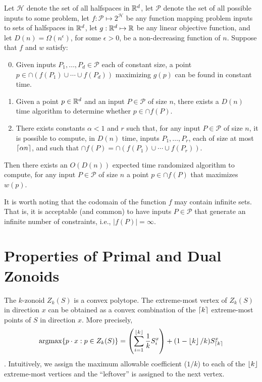 \documentclass[lotsofwhite]{patmorin}
\newcommand{\argmax}{\mathrm{argmax}}
\begin{document}
\begin{thm}[Chan 2004]
Let $\mathcal{H}$ denote the set of all halfspaces in $\mathbb{R}^d$,
let $\mathcal{P}$ denote the set of all possible inputs to some problem, 
let $f:\mathcal{P}\mapsto 2^{\mathcal{H}}$ be any function mapping 
problem inputs to sets of halfspaces in $\mathbb{R}^d$,
let $g:\mathbb{R}^d\mapsto \mathbb{R}$ be
any linear objective function, 
and let $D(n)=\Omega(n^{\epsilon})$, for some $\epsilon>0$, be a non-decreasing function of
$n$.  Suppose that $f$ and $w$ satisfy:
\begin{enumerate}
\setcounter{enumi}{-1}
\item Given inputs $P_1,\ldots,P_d\in\mathcal{P}$ each of constant
size, a point $p\in\cap (f(P_1)\cup\cdots\cup f(P_d))$ maximizing
$g(p)$ can be found in constant time.

\item Given a point $p\in\mathbb{R}^d$ and an input $P\in\mathcal{P}$
of size $n$, there exists a $D(n)$ time algorithm to determine whether
$p\in\cap f(P)$.

\item There exists constants $\alpha < 1$ and $r$ such that, for any
input $P\in\mathcal{P}$ of size $n$, it is possible to compute, in
$D(n)$ time, inputs $P_1,\ldots,P_r$, each of size at most
$\left\lceil \alpha n \right\rceil$, and such that $\cap f(P) =
\cap(f(P_1)\cup\cdots\cup f(P_r))$.

\end{enumerate}
Then there exists an $O(D(n))$ expected time randomized algorithm to
compute, for any input $P\in\mathcal{P}$ of size $n$ a point
$p\in\cap f(P)$ that maximizes $w(p)$.
\end{thm}

It is worth noting that the codomain of the function $f$ may contain
infinite sets.  That is, it is acceptable (and common) to have inputs
$P\in\mathcal{P}$ that generate an infinite number of constraints,
i.e., $|f(P)|=\infty$.


\section{Properties of Primal and Dual Zonoids}

The $k$-zonoid $Z_k(S)$ is a convex polytope.  The extreme-most vertex
of $Z_k(S)$ in direction $x$ can be obtained as a convex combination of the
$\left\lceil k \right\rceil$ extreme-most points of $S$ in direction $x$.  More
precisely,
\begin{equation} 
\argmax\{p\cdot x: p\in Z_k(S)\} =
        \left(\sum_{i=1}^{\floor{k}} \frac{1}{k}S_i^x\right) +
          (1-\floor{k}/k)S_{\ceil{k}}^x  
          \eqlabel{extreme}
\end{equation}
\cite{beXX,gmXX}.  Intuitively, we assign the maximum allowable
coefficient ($1/k$) to each of the $\left\lfloor k \right\rfloor$ extreme-most vertices
and the ``leftover'' is assigned to the next vertex.
\end{document}
